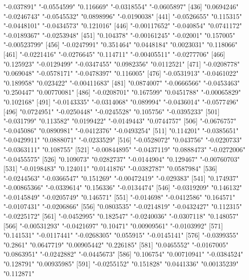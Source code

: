 \begin{Schunk}
\begin{Soutput}
[431] "-0.037891"    "-0.0554599"   "0.116669"     "-0.0318554"   "-0.0605897"  
[436] "0.0694246"    "-0.0246743"   "-0.0545532"   "0.0898996"    "-0.0190038"  
[441] "-0.0526655"   "0.115315"     "-0.0448101"   "-0.0434573"   "0.121016"    
[446] "-0.00117652"  "-0.040854"    "0.0741172"    "-0.0189367"   "-0.0253948"  
[451] "0.104378"     "-0.00161245"  "-0.02001"     "0.157005"     "-0.00523799" 
[456] "-0.0247991"   "0.351464"     "0.0448184"    "0.0023031"    "0.118066"    
[461] "-0.0221416"   "-0.0276645"   "0.114711"     "-0.00405511"  "-0.0277706"  
[466] "0.125923"     "-0.0129499"   "-0.0347455"   "0.0982356"    "0.0112521"   
[471] "-0.0208778"   "0.069048"     "-0.0578171"   "-0.0478397"   "0.116005"    
[476] "-0.0531913"   "-0.0461022"   "0.189958"     "0.023422"     "-0.00411683" 
[481] "0.0874007"    "-0.0666566"   "-0.0453463"   "0.250447"     "0.00770081"  
[486] "-0.0208701"   "0.167599"     "0.0451788"    "-0.00065829"  "0.102168"    
[491] "-0.0143335"   "-0.0314068"   "0.089994"     "-0.0436014"   "-0.0577496"  
[496] "0.0724951"    "-0.0250448"   "-0.0245528"   "0.105756"     "-0.0395233"  
[501] "-0.031799"    "0.113582"     "0.0199422"    "-0.0149443"   "0.0744757"   
[506] "-0.0676757"   "-0.045086"    "0.0890981"    "-0.0412376"   "-0.0493254"  
[511] "0.114201"     "-0.0385651"   "-0.0429911"   "0.0888071"    "-0.0233529"  
[516] "-0.0528072"   "0.043756"     "-0.0220733"   "-0.0363111"   "0.108755"    
[521] "-0.00844895"  "-0.0437119"   "0.0888473"    "-0.0272006"   "-0.0455575"  
[526] "0.109073"     "0.0282737"    "-0.0144904"   "0.129467"     "-0.00760703" 
[531] "-0.0198483"   "0.124011"     "0.0141876"    "-0.0382787"   "0.0587984"   
[536] "-0.0244563"   "-0.0366547"   "0.151269"     "-0.00472419"  "-0.029383"   
[541] "0.174937"     "-0.00865366"  "-0.0339614"   "0.156336"     "-0.0134474"  
[546] "-0.0319209"   "0.146132"     "-0.0145849"   "-0.0205749"   "0.146571"    
[551] "-0.014698"    "-0.0412586"   "0.164571"     "-0.0107431"   "-0.0206866"  
[556] "0.0803535"    "-0.0214819"   "-0.0432427"   "0.112315"     "-0.0225172"  
[561] "-0.0452995"   "0.182547"     "-0.0240036"   "-0.0307118"   "0.148057"    
[566] "-0.00531293"  "-0.0421697"   "0.10471"      "0.00909561"   "-0.0103992"  
[571] "0.141531"     "-0.0117441"   "-0.0268305"   "0.055915"     "-0.0145141"  
[576] "-0.0399355"   "0.2861"       "0.0647719"    "0.00905442"   "0.226185"    
[581] "0.0465552"    "-0.0167005"   "0.0863951"    "-0.0242882"   "-0.0445673"  
[586] "0.106754"     "0.00710941"   "-0.0384524"   "0.128791"     "0.00935985"  
[591] "-0.0255152"   "0.151828"     "0.0441336"    "0.00135239"   "0.112871"    

\end{Soutput}
\end{Schunk}

